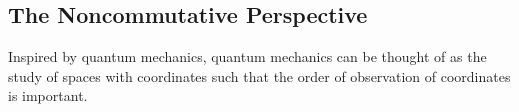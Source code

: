     
%    

\subsection{The Noncommutative Perspective}
Inspired by quantum mechanics, quantum mechanics can be thought
of as the study of spaces with coordinates such that the order of observation
of coordinates is important. 

